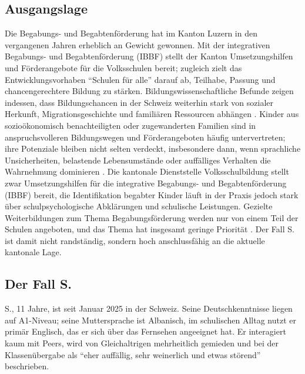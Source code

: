 \documentclass[ngerman, a4paper]{article}
\begin{document}
\subsection*{Ausgangslage}
 
Die Begabungs- und Begabtenförderung hat im Kanton Luzern in den vergangenen Jahren
erheblich an Gewicht gewonnen. Mit der integrativen Begabungs- und Begabtenförderung
(IBBF) stellt der Kanton Umsetzungshilfen und Förderangebote für die Volksschulen bereit;
zugleich zielt das Entwicklungsvorhaben \enquote{Schulen für alle} darauf ab, Teilhabe, Passung
und chancengerechtere Bildung zu stärken. Bildungswissenschaftliche Befunde zeigen
indessen, dass Bildungschancen in der Schweiz weiterhin stark von sozialer Herkunft,
Migrationsgeschichte und familiären Ressourcen abhängen
\parencite{erzinger2023pisa,stamm2021fehlenderblick,bfs2022migration}.%
Kinder aus sozioökonomisch benachteiligten oder zugewanderten Familien sind in
anspruchsvolleren Bildungswegen und Förderangeboten häufig untervertreten; ihre Potenziale
bleiben nicht selten verdeckt, insbesondere dann, wenn sprachliche Unsicherheiten, belastende
Lebensumstände oder auffälliges Verhalten die Wahrnehmung dominieren
\parencite{kellerkoller2021hellekoepfe,leikhof2021jugendliche}.%
Die kantonale Dienststelle Volksschulbildung stellt zwar Umsetzungshilfen für die
integrative Begabungs- und Begabtenförderung (IBBF) bereit, die Identifikation
begabter Kinder läuft in der Praxis jedoch stark über schulpsychologische
Abklärungen und schulische Leistungen. Gezielte Weiterbildungen zum Thema
Begabungsförderung werden nur von einem Teil der Schulen angeboten, und das %
Thema hat insgesamt geringe Priorität \parencite{dvs2025bbf}. Der Fall S. ist
damit nicht randständig, sondern hoch anschlussfähig an die aktuelle kantonale Lage.
 
\subsection*{Der Fall S.}
 
S., 11 Jahre, ist seit Januar 2025 in der Schweiz. Seine Deutschkenntnisse liegen auf
A1-Niveau; seine Muttersprache ist Albanisch, im schulischen Alltag nutzt er primär
Englisch, das er sich über das Fernsehen angeeignet hat. Er interagiert kaum mit Peers,
wird von Gleichaltrigen mehrheitlich gemieden und bei der Klassenübergabe als
\enquote{eher auffällig, sehr weinerlich und etwas störend} beschrieben.
 
\end{document}
